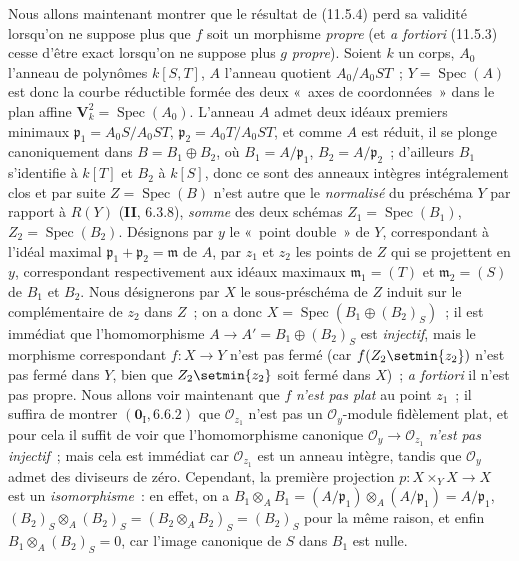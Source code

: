 \begin{env}[11.7.2]
\label{IV.11.7.2-fr}
Nous allons maintenant montrer que le résultat de (11.5.4) perd sa validité
lorsqu'on ne suppose plus que $f$ soit un morphisme \emph{propre} (et
\emph{a fortiori} (11.5.3) cesse d'être exact lorsqu'on ne suppose plus $g$
\emph{propre}). Soient $k$ un corps, $A_0$ l'anneau de polynômes $k[S,T]$, $A$
l'anneau quotient $A_0/A_0ST$~; $Y=\operatorname{Spec}(A)$ est donc la courbe
réductible formée des deux «~axes de coordonnées~» dans le plan affine
$\mathbf V_k^2=\operatorname{Spec}(A_0)$. L'anneau $A$ admet deux idéaux premiers
minimaux $\mathfrak p_1=A_0S/A_0ST$, $\mathfrak p_2=A_0T/A_0ST$, et comme $A$
est réduit, il se plonge canoniquement dans $B=B_1\oplus B_2$, où
$B_1=A/\mathfrak p_1$, $B_2=A/\mathfrak p_2$~; d'ailleurs $B_1$ s'identifie à
$k[T]$ et $B_2$ à $k[S]$, donc ce sont des anneaux intègres intégralement clos
et par suite $Z=\operatorname{Spec}(B)$ n'est autre que le \emph{normalisé} du
préschéma $Y$ par rapport à $R(Y)$ (\textbf{II}, 6.3.8), \emph{somme} des deux schémas
$Z_1=\operatorname{Spec}(B_1)$, $Z_2=\operatorname{Spec}(B_2)$. Désignons par
$y$ le «~point double~» de $Y$, correspondant à l'idéal maximal
$\mathfrak p_1+\mathfrak p_2=\mathfrak m$ de $A$, par $z_1$ et $z_2$ les
points de $Z$ qui se projettent en $y$, correspondant respectivement aux idéaux
maximaux $\mathfrak m_1=(T)$ et $\mathfrak m_2=(S)$ de $B_1$ et $B_2$. Nous
désignerons par $X$ le sous-préschéma de $Z$ induit sur le complémentaire de
$z_2$ dans $Z$~; on a donc
$X=\operatorname{Spec}(B_1\oplus(B_2)_S)$~; il est immédiat que
l'homomorphisme $A\to A'=B_1\oplus(B_2)_S$ est \emph{injectif}, mais le morphisme
correspondant $f:X\to Y$ n'est pas fermé (car $f(Z_2\setmin\{z_2\})$ n'est pas fermé
dans $Y$, bien que $Z_2\setmin\{z_2\}$ soit fermé dans $X$)~; \emph{a fortiori} il
n'est pas propre. Nous allons voir maintenant que $f$ \emph{n'est pas plat} au point
$z_1$~; il suffira de montrer $(\mathbf 0_{\mathrm I},6.6.2)$ que
$\mathcal O_{z_1}$ n'est pas un $\mathcal O_y$-module fidèlement plat, et pour
cela il suffit de voir que l'homomorphisme canonique
$\mathcal O_y\to\mathcal O_{z_1}$ \emph{n'est pas injectif}~; mais cela est immédiat
car $\mathcal O_{z_1}$ est un anneau intègre, tandis que $\mathcal O_y$ admet
des diviseurs de zéro. Cependant, la première projection
$p:X\times_Y X\to X$ est un \emph{isomorphisme}~: en effet, on a
$B_1\otimes_A B_1=(A/\mathfrak p_1)\otimes_A(A/\mathfrak p_1)=A/\mathfrak p_1$,
$(B_2)_S\otimes_A(B_2)_S=(B_2\otimes_A B_2)_S=(B_2)_S$ pour la même raison,
et enfin $B_1\otimes_A(B_2)_S=0$, car l'image canonique de $S$ dans $B_1$ est
nulle.
\end{env}

